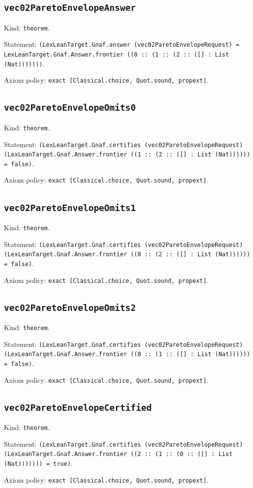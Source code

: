 \documentclass[11pt]{article}
\begin{document}
\subsection*{\texttt{vec02ParetoEnvelopeAnswer}}
\noindent Kind: \texttt{theorem}.\par
\noindent Statement: \texttt{(LexLeanTarget.Gnaf.answer (vec02ParetoEnvelopeRequest) = LexLeanTarget.Gnaf.Answer.frontier ((0 :: (1 :: (2 :: ([] : List (Nat)))))))}.\par
\noindent Axiom policy: \texttt{exact [Classical.choice, Quot.sound, propext]}.\par
\subsection*{\texttt{vec02ParetoEnvelopeOmits0}}
\noindent Kind: \texttt{theorem}.\par
\noindent Statement: \texttt{(LexLeanTarget.Gnaf.certifies (vec02ParetoEnvelopeRequest) (LexLeanTarget.Gnaf.Answer.frontier ((1 :: (2 :: ([] : List (Nat)))))) = false)}.\par
\noindent Axiom policy: \texttt{exact [Classical.choice, Quot.sound, propext]}.\par
\subsection*{\texttt{vec02ParetoEnvelopeOmits1}}
\noindent Kind: \texttt{theorem}.\par
\noindent Statement: \texttt{(LexLeanTarget.Gnaf.certifies (vec02ParetoEnvelopeRequest) (LexLeanTarget.Gnaf.Answer.frontier ((0 :: (2 :: ([] : List (Nat)))))) = false)}.\par
\noindent Axiom policy: \texttt{exact [Classical.choice, Quot.sound, propext]}.\par
\subsection*{\texttt{vec02ParetoEnvelopeOmits2}}
\noindent Kind: \texttt{theorem}.\par
\noindent Statement: \texttt{(LexLeanTarget.Gnaf.certifies (vec02ParetoEnvelopeRequest) (LexLeanTarget.Gnaf.Answer.frontier ((0 :: (1 :: ([] : List (Nat)))))) = false)}.\par
\noindent Axiom policy: \texttt{exact [Classical.choice, Quot.sound, propext]}.\par
\subsection*{\texttt{vec02ParetoEnvelopeCertified}}
\noindent Kind: \texttt{theorem}.\par
\noindent Statement: \texttt{(LexLeanTarget.Gnaf.certifies (vec02ParetoEnvelopeRequest) (LexLeanTarget.Gnaf.Answer.frontier ((2 :: (1 :: (0 :: ([] : List (Nat))))))) = true)}.\par
\noindent Axiom policy: \texttt{exact [Classical.choice, Quot.sound, propext]}.\par
\end{document}
